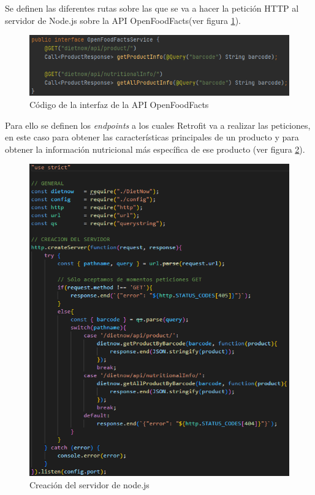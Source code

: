 Se definen las diferentes rutas sobre las que se va a hacer la petición HTTP al servidor de Node.js sobre la API OpenFoodFacts(ver figura \ref{fig:retrointerface}).
\begin{figure}[H]
    \centering
    \includegraphics[width=\textwidth]{Images/Capitulo7/retrointerface.png}
        \caption{Código de la interfaz de la API OpenFoodFacts}
    \label{fig:retrointerface}
\end{figure}

Para ello se definen los \textit{endpoints} a los cuales Retrofit va a realizar las peticiones, en este caso para obtener las características principales de un producto y para obtener la información nutricional más específica de ese producto (ver figura \ref{fig:creacionservidor}).

\begin{figure}[H]
    \centering
    \includegraphics[width=\textwidth]{Images/Capitulo7/creacionservidor.png}
        \caption{Creación del servidor de node.js}
    \label{fig:creacionservidor}
\end{figure}

